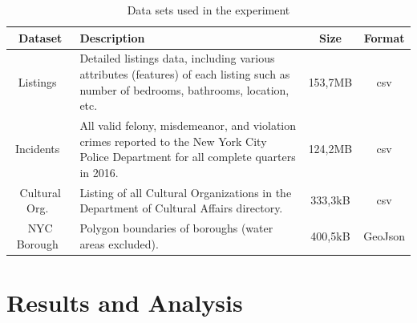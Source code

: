 \documentclass[sigconf]{acmart}
\begin{document}
\begin{table}[!htpb]
	\fontsize{7pt}{7pt}\selectfont
	\centering
	\caption{Data sets used in the experiment}
	\label{tab:datasets}
	\begin{tabular}{cp{3.5cm}cc}
		\toprule
		         \textbf{Dataset}          & \textbf{Description}                                                                                                                   & \textbf{Size} & \textbf{Format} \\ \midrule
		   Listings~\cite{base:airbnb}     & Detailed listings data, including various attributes (features) of each listing such as number of bedrooms, bathrooms, location, etc.  &    153,7MB    &       csv       \\ \midrule
		 Incidents~\cite{base:incidents}   & All valid felony, misdemeanor, and violation crimes reported to the New York City Police Department for all complete quarters in 2016. &    124,2MB    &       csv       \\ \midrule
		Cultural Org.~\cite{base:cultural} & Listing of all Cultural Organizations in the Department of Cultural Affairs directory.                                                 &    333,3kB    &       csv       \\ \midrule
		 NYC Borough~\cite{base:borough}   & Polygon boundaries of boroughs (water areas excluded).                                                                                 &    400,5kB    &     GeoJson     \\ \bottomrule
	\end{tabular}
\end{table}

%

\section{Results and Analysis}
\label{sec:results}
\end{document}

